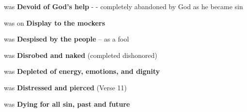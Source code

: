 \begin{compactenum}[I.][8]
    \item was \textbf{Devoid of God's help} - - completely abandoned by God as he became sin
    \item was on \textbf{Display to the mockers} 
    \item was \textbf{Despised by the people} -- as a fool
    \item was \textbf{Disrobed and naked}  (completed dishonored)
    \item was \textbf{Depleted of energy, emotions, and dignity} 
    \item was \textbf{Distressed and pierced} (Verse 11)
    \item was \textbf{Dying for all sin, past and future} 
\end{compactenum}
